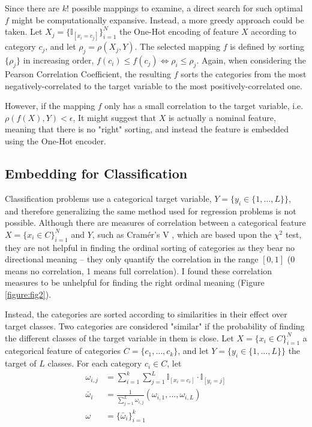 \documentclass{article}
\begin{document}
Since there are $k!$ possible mappings to examine, a direct search for such optimal $f$ might be computationally expansive. Instead, a more greedy approach could be taken. Let $X_j = \{\mathbb{I}_{[x_i = c_j]}\}_{i=1}^N$ the One-Hot encoding of feature $X$ according to category $c_j$, and let $\rho_j = \rho(X_j,Y)$. 
The selected mapping $f$ is defined by sorting $\{\rho_j\}$ in increasing order, 
$f(c_i) \leq f(c_j) \iff \rho_i \leq \rho_j$. Again, when considering the Pearson Correlation Coefficient, the resulting $f$ sorts the categories from the most negatively-correlated to the target variable to the most positively-correlated one.

However, if the mapping $f$ only has a small correlation to the target variable, i.e. $\rho(f(X), Y) < \epsilon$, 
It might suggest that $X$ is actually a nominal feature, meaning that there is no "right"  sorting, and instead the feature is embedded using the One-Hot encoder.

\subsection{Embedding for Classification}
Classification problems use a categorical target variable, $Y=\{y_i \in \{1, \dots, L\}\}$, and therefore generalizing the same method used for regression problems is not possible. Although there are measures of correlation between a categorical feature $X=\{x_i \in C\}_{i=1}^N$ and $Y$, such as Cramér's V \cite{cramer1999mathematical}, which are based upon the $\chi^2$ test, they are not helpful in finding the ordinal sorting of categories as they bear no directional meaning -- they only quantify the correlation in the range $[0,1]$ (0 means no correlation, 1 means full correlation). I found these correlation measures to be unhelpful for finding the right ordinal meaning (Figure \ref{figure:fig2}).

Instead, the categories are sorted according to similarities in their effect over target classes. Two categories are considered "similar" if the probability of finding the different classes of the target variable in them is close. Let  $X=\{x_i \in C\}_{i=1}^N$ a categorical feature of categories $C=\{c_1,\dots,c_k\}$, and let $Y=\{y_i \in \{1, \dots, L\}\}$ the target of $L$ classes. For each category $c_i \in C$, let 
\begin{align*}
\omega_{i,j} & = \sum_{i=1}^k \sum_{j=1}^L \mathbb{I}_{[x_i = c_i]} \cdot \mathbb{I}_{[y_i = j]} \\
\bar{\omega}_i & = \frac{1}{\sum_{j=1}^L \omega_{i,j}} (\omega_{i,1}, \dots, \omega_{i, L}) \\
\omega &= \{\bar{\omega}_i \}_{i=1}^k
\end{align*}
\end{document}
